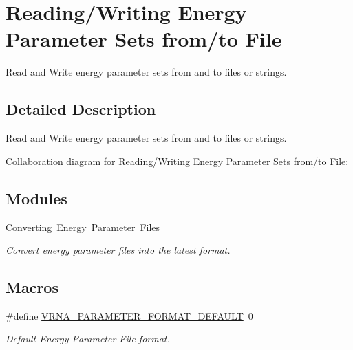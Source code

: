 \hypertarget{group__energy__parameters__rw}{}\section{Reading/\+Writing Energy Parameter Sets from/to File}
\label{group__energy__parameters__rw}


Read and Write energy parameter sets from and to files or strings.  




\subsection{Detailed Description}
Read and Write energy parameter sets from and to files or strings. 

Collaboration diagram for Reading/\+Writing Energy Parameter Sets from/to File\+:
\subsection*{Modules}
\begin{DoxyCompactItemize}
\item 
\mbox{\hyperlink{group__energy__parameters__convert}{Converting Energy Parameter Files}}
\begin{DoxyCompactList}\small\item\em Convert energy parameter files into the latest format. \end{DoxyCompactList}\end{DoxyCompactItemize}
\subsection*{Macros}
\begin{DoxyCompactItemize}
\item 
\#define \mbox{\hyperlink{group__energy__parameters__rw_ga2d46720ac5bf0e56ce0dbbff459667d2}{V\+R\+N\+A\+\_\+\+P\+A\+R\+A\+M\+E\+T\+E\+R\+\_\+\+F\+O\+R\+M\+A\+T\+\_\+\+D\+E\+F\+A\+U\+LT}}~0
\begin{DoxyCompactList}\small\item\em Default Energy Parameter File format. \end{DoxyCompactList}\end{DoxyCompactItemize}
